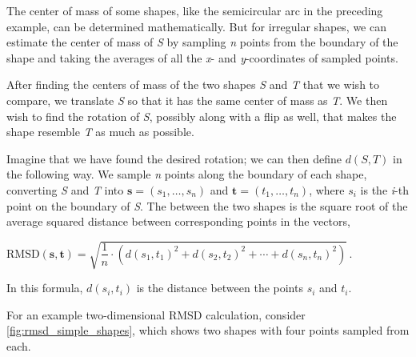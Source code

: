 \begin{qbox}\end{qbox}

The center of mass of some shapes, like the semicircular arc in the preceding example, can be determined mathematically. But for irregular shapes, we can estimate the center of mass of \textit{S} by sampling \textit{n} points from the boundary of the shape and taking the averages of all the \textit{x}- and \textit{y}-coordinates of sampled points.

After finding the centers of mass of the two shapes \textit{S} and \textit{T} that we wish to compare, we translate \textit{S} so that it has the same center of mass as \textit{T}. We then wish to find the rotation of \textit{S}, possibly along with a flip as well, that makes the shape resemble \textit{T} as much as possible.

Imagine that we have found the desired rotation; we can then define $d(S, T)$ in the following way. We sample \textit{n} points along the boundary of each shape, converting \textit{S} and \textit{T} into  $\mathbf{s} = (s_{1}, \ldots, s_{n})$ and $\mathbf{t} = (t_{1}, \ldots, t_{n})$, where $s_{i}$ is the \textit{i}-th point on the boundary of \textit{S}. The  between the two shapes is the square root of the average squared distance between corresponding points in the vectors,

\begin{center}
$\text{RMSD}(\mathbf{s}, \mathbf{t}) = \sqrt{\dfrac{1}{n} \cdot \left(d(s_1, t_1)^2 + d(s_2, t_2)^2 + \cdots + d(s_n, t_n)^2\right)}$\,.
\end{center}

\noindent In this formula, $d(s_{i}, t_{i})$ is the distance between the points $s_{i}$ and $t_{i}$.\\

\begin{note}\end{note}

For an example two-dimensional RMSD calculation, consider \autoref{fig:rmsd_simple_shapes}, which shows two shapes with four points sampled from each.\\


